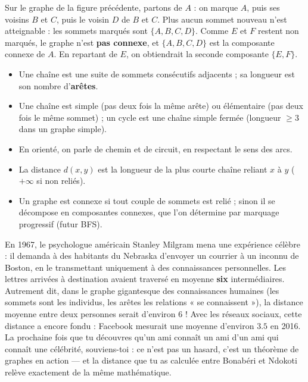 \documentclass[11pt]{article}
\newcommand{\cle}[1]{{\popxbold\color{popdark}#1}}
\begin{document}
\begin{exemplebox}
Sur le graphe de la figure précédente, partons de $A$ : on marque $A$, puis ses voisins $B$ et $C$, puis le voisin $D$ de $B$ et $C$. Plus aucun sommet nouveau n'est atteignable : les sommets marqués sont $\{A, B, C, D\}$. Comme $E$ et $F$ restent non marqués, le graphe n'est \textbf{pas connexe}, et $\{A,B,C,D\}$ est la composante connexe de $A$. En repartant de $E$, on obtiendrait la seconde composante $\{E, F\}$.
\end{exemplebox}

\begin{aretenir}
\begin{itemize}
\item Une \cle{chaîne} est une suite de sommets consécutifs adjacents ; sa \cle{longueur} est son nombre d'\textbf{arêtes}.
\item Une chaîne est \cle{simple} (pas deux fois la même arête) ou \cle{élémentaire} (pas deux fois le même sommet) ; un \cle{cycle} est une chaîne simple fermée (longueur $\ge 3$ dans un graphe simple).
\item En orienté, on parle de \cle{chemin} et de \cle{circuit}, en respectant le sens des arcs.
\item La \cle{distance} $d(x,y)$ est la longueur de la plus courte chaîne reliant $x$ à $y$ ($+\infty$ si non reliés).
\item Un graphe est \cle{connexe} si tout couple de sommets est relié ; sinon il se décompose en \cle{composantes connexes}, que l'on détermine par marquage progressif (futur BFS).
\end{itemize}
\end{aretenir}

\begin{savaistu}
En 1967, le psychologue américain Stanley Milgram mena une expérience célèbre : il demanda à des habitants du Nebraska d'envoyer un courrier à un inconnu de Boston, en le transmettant uniquement à des connaissances personnelles. Les lettres arrivées à destination avaient traversé en moyenne \textbf{six} intermédiaires. Autrement dit, dans le graphe gigantesque des connaissances humaines (les sommets sont les individus, les arêtes les relations « se connaissent »), la distance moyenne entre deux personnes serait d'environ $6$ ! Avec les réseaux sociaux, cette distance a encore fondu : Facebook mesurait une moyenne d'environ $\num{3,5}$ en 2016. La prochaine fois que tu découvres qu'un ami connaît un ami d'un ami qui connaît une célébrité, souviens-toi : ce n'est pas un hasard, c'est un théorème de graphes en action — et la distance que tu as calculée entre Bonabéri et Ndokoti relève exactement de la même mathématique.
\end{savaistu}
\end{document}
